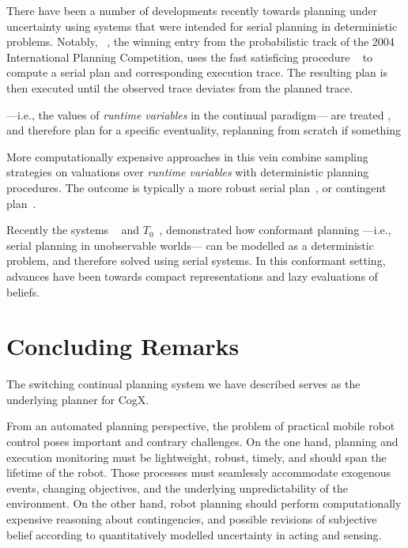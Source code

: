 \documentclass[letterpaper]{article}
\begin{document}
There have been a number of developments recently towards planning
under uncertainty using systems that were intended for serial planning
in deterministic problems.  Notably,
~\cite{yoon:etal:2007}, the winning entry from the
probabilistic track of the 2004 International Planning Competition,
uses the fast satisficing procedure
~\cite{hoffmann:nebel:2001} to compute a serial plan and
corresponding execution trace. The resulting plan is then executed
until the observed trace deviates from the planned trace.

 ---i.e., the values of {\em
runtime variables} in the continual paradigm--- are treated , and
therefore plan for a specific eventuality, replanning from scratch if
something


More computationally expensive approaches in this vein combine
sampling strategies on valuations over {\em runtime variables} with
deterministic planning procedures. The outcome is typically a more
robust serial plan~\cite{yoon:etal:2008}, or contingent
plan~\cite{majercik:2006}.



Recently the systems
~\cite{hoffmann:brafman:2006} and
$T_0$~\cite{palacios:geffner:2009}, demonstrated how conformant
planning ---i.e., serial planning in unobservable worlds--- can be
modelled as a deterministic problem, and therefore solved using serial
systems. In this conformant setting, advances have been towards
compact representations and lazy evaluations of beliefs.
 

\section{Concluding Remarks}

The switching continual planning system we have described serves as
the underlying planner for CogX. 





From an automated planning perspective, the problem of practical
mobile robot control poses important and contrary challenges.
On the one hand, planning and execution monitoring must be
lightweight, robust, timely, and should span the lifetime of the
robot. Those processes must seamlessly accommodate exogenous events,
changing objectives, and the underlying unpredictability of the
environment.
On the other hand, robot planning should perform computationally
expensive reasoning about contingencies, and possible revisions of
subjective belief according to quantitatively modelled uncertainty in
acting and sensing. 
\end{document}
